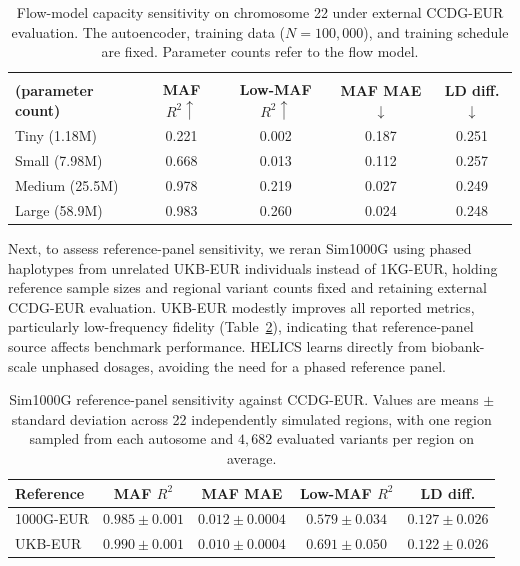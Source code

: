 \documentclass{article}
\begin{document}
\begin{table}[h]
\centering
\caption{Flow-model capacity sensitivity on chromosome 22 under external CCDG-EUR evaluation. The autoencoder, training data ($N = 100{,}000$), and training schedule are fixed. Parameter counts refer to the flow model.}
\label{tab:flow_capacity}
\small
\begin{tabular}{lcccc}
\toprule
\shortstack{\textbf{Flow model}\\\textbf{(parameter count)}}
& \textbf{MAF} \(R^2 \uparrow\)
& \textbf{Low-MAF} \(R^2 \uparrow\)
& \textbf{MAF MAE} \(\downarrow\)
& \textbf{LD diff.} \(\downarrow\) \\
\midrule
Tiny (1.18M) & 0.221 & 0.002 & 0.187 & 0.251 \\
Small (7.98M) & 0.668 & 0.013 & 0.112 & 0.257 \\
Medium (25.5M) & 0.978 & 0.219 & 0.027 & 0.249 \\
Large (58.9M) & 0.983 & 0.260 & 0.024 & 0.248 \\
\bottomrule
\end{tabular}
\end{table}

Next, to assess reference-panel sensitivity, we reran Sim1000G using phased haplotypes from unrelated UKB-EUR individuals instead of 1KG-EUR, holding reference sample sizes and regional variant counts fixed and retaining external CCDG-EUR evaluation. UKB-EUR modestly improves all reported metrics, particularly low-frequency fidelity (Table~\ref{tab:reference_sensitivity}), indicating that reference-panel source affects benchmark performance. HELICS learns directly from biobank-scale unphased dosages, avoiding the need for a phased reference panel.

\begin{table}[h]
\centering
\caption{Sim1000G reference-panel sensitivity against CCDG-EUR. Values are means \(\pm\) standard deviation across 22 independently simulated regions, with one region sampled from each autosome and \(4{,}682\) evaluated variants per region on average.}
\label{tab:reference_sensitivity}
\small
\begin{tabular}{lcccc}
\toprule
Reference & MAF \(R^2\) & MAF MAE & Low-MAF \(R^2\) & LD diff. \\
\midrule
1000G-EUR & \(0.985\pm0.001\) & \(0.012\pm0.0004\) & \(0.579\pm0.034\) & \(0.127\pm0.026\) \\
UKB-EUR & \(0.990\pm0.001\) & \(0.010\pm0.0004\) & \(0.691\pm0.050\) & \(0.122\pm0.026\) \\
\bottomrule
\end{tabular}
\end{table}
\end{document}
